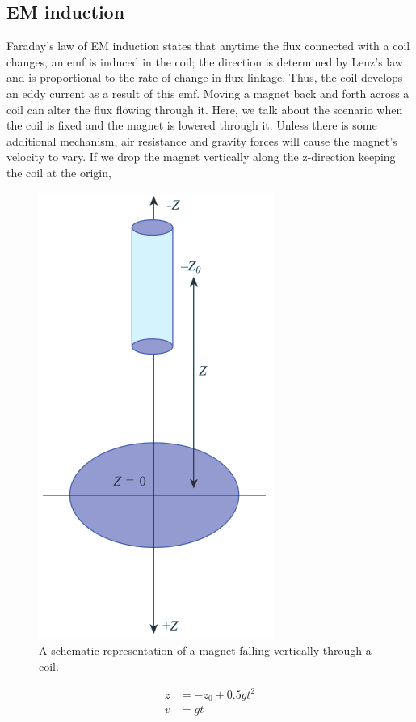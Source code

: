 \subsection{EM induction}

    Faraday's law of EM induction states that anytime the flux connected with a coil changes, an emf is induced in the coil; the direction is determined by Lenz's law and is proportional to the rate of change in flux linkage. Thus, the coil develops an eddy current as a result of this emf. Moving a magnet back and forth across a coil can alter the flux flowing through it. Here, we talk about the scenario when the coil is fixed and the magnet is lowered through it. Unless there is some additional mechanism, air resistance and gravity forces will cause the magnet's velocity to vary. If we drop the magnet vertically along the z-direction keeping the coil at the origin,
    
\begin{figure}[h]
    \centering
    \includegraphics[width=0.5\columnwidth]{images/fall.png}
    \caption{A schematic representation of a magnet falling vertically through a coil.}
    \label{th:7.5}
\end{figure}

    \begin{align*}
        z&=-z_0+ 0.5gt^2\\v&=gt
    \end{align*}

